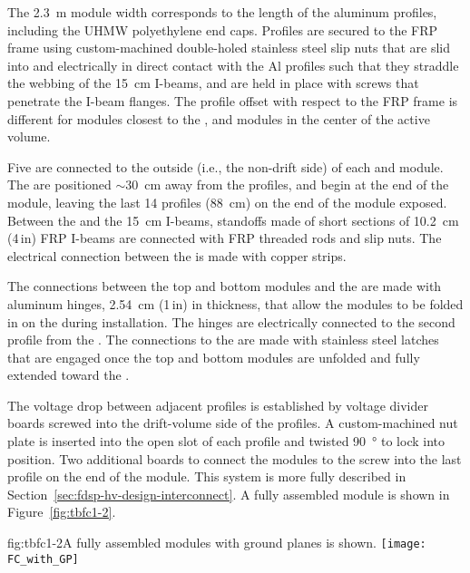 The \SI{2.3}{\m} module width corresponds to the length of the aluminum profiles, including the UHMW polyethylene end caps. Profiles are secured to the FRP frame using custom-machined double-holed stainless steel slip nuts that are slid into and electrically in direct contact with the Al profiles such that they straddle the webbing of the \SI{15}{\cm} I-beams, and are held in place with screws that penetrate the I-beam flanges. The profile offset with respect to the FRP frame is different for modules closest to the , %
and modules in the center of the active volume.

Five  are connected to the outside (i.e., the non-drift side) of each  and  module. The  are positioned $\sim$\SI{30}{\cm} away from the profiles, and begin at the  end of the module, leaving the last 14 profiles (\SI{88}{\cm}) on the  end of the module exposed. Between the  and the \SI{15}{\cm} I-beams, standoffs made of short sections of \SI{10.2}{\cm} (4\,in)  FRP I-beams are connected with FRP threaded rods and slip nuts. The electrical connection between the  is made with copper strips.

The connections between the top and bottom modules and the  are made with aluminum hinges, \SI{2.54}{\cm} (1\,in) in thickness, that allow the modules to be folded in on the  during installation. The hinges are electrically connected to the second profile from the . The connections to the  are made with stainless steel latches that are engaged once the top and bottom  modules are unfolded and fully extended toward the .

The voltage drop between adjacent profiles is established by voltage divider boards screwed into the drift-volume side of the profiles. A custom-machined nut plate %
is inserted into the open slot of each profile and twisted \SI{90}{\degree} %
to lock into position. Two additional boards to connect the modules to the  %
screw into the last profile on the  end of the module. This system is %
more fully described in Section~\ref{sec:fdsp-hv-design-interconnect}. A fully assembled module is shown in Figure~\ref{fig:tbfc1-2}.

\begin{dunefigure}{fig:tbfc1-2}{A fully assembled modules with ground planes is shown.} %
\texttt{[image: FC\_with\_GP]}
\end{dunefigure}


